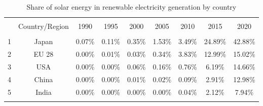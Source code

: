 \begin{table}[!htbp] \centering 
  \caption{Share of solar energy in renewable electricity generation by country} 
  \label{} 
\begin{tabular}{@{\extracolsep{5pt}} ccccccccc} 
\\[-1.8ex]\hline 
\hline \\[-1.8ex] 
 & Country/Region & 1990 & 1995 & 2000 & 2005 & 2010 & 2015 & 2020 \\ 
\hline \\[-1.8ex] 
1 & Japan & 0.07\% & 0.11\% & 0.35\% & 1.53\% & 3.49\% & 24.89\% & 42.88\% \\ 
2 & EU 28 & 0.00\% & 0.01\% & 0.03\% & 0.34\% & 3.83\% & 12.99\% & 15.02\% \\ 
3 & USA & 0.00\% & 0.00\% & 0.06\% & 0.16\% & 0.76\% & 6.19\% & 14.66\% \\ 
4 & China & 0.00\% & 0.00\% & 0.01\% & 0.02\% & 0.09\% & 2.91\% & 12.98\% \\ 
5 & India & 0.00\% & 0.00\% & 0.00\% & 0.00\% & 0.04\% & 2.12\% & 7.94\% \\ 
\hline \\[-1.8ex]  
\end{tabular} 
\end{table} 